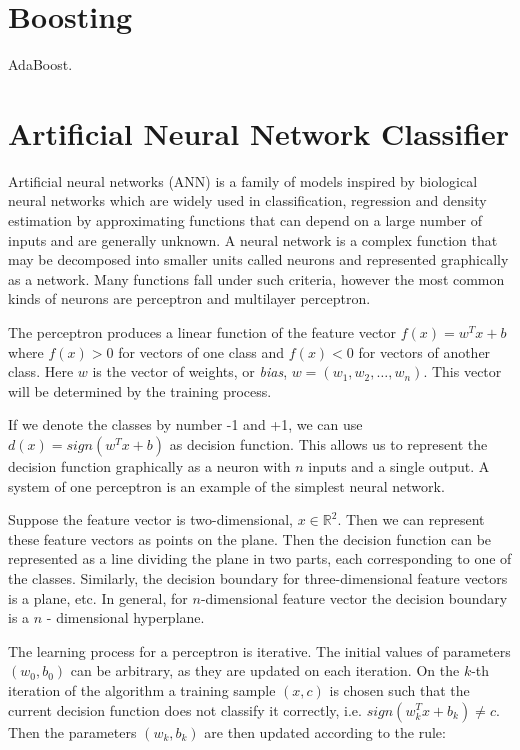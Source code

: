 \documentclass[12pt]{report}
\newcommand{\re}{\mathbb{R}}
\begin{document}
\section{Boosting}

AdaBoost.

\newpage

\section{Artificial Neural Network Classifier}

Artificial neural networks (ANN) is a family of models inspired by biological neural networks which are widely used in classification, regression and density estimation by approximating functions that can depend on a large number of inputs and are generally unknown. A neural network is a complex function that may be decomposed into smaller units called neurons and represented graphically as a network. Many functions fall under such criteria, however the most common kinds of neurons are perceptron and multilayer perceptron.

The perceptron produces a linear function of the feature vector $f(x) = w^Tx + b$ where $f(x) > 0$ for vectors of one class and $f(x) < 0$ for vectors of another class. Here $w$ is the vector of weights, or \textit{bias}, $w = (w_1, w_2, \dots, w_n)$. This vector will be determined by the training process.

If we denote the classes by number -1 and +1, we can use $d(x) = sign(w^Tx + b)$ as decision function. This allows us to represent the decision function graphically as a neuron with $n$ inputs and a single output. A system of one perceptron is an example of the simplest neural network.

Suppose the feature vector is two-dimensional, $x \in \re^2$. Then we can represent these feature vectors as points on the plane. Then the decision function can be represented as a line dividing the plane in two parts, each corresponding to one of the classes. Similarly, the decision boundary for three-dimensional feature vectors is a plane, etc. In general, for $n$-dimensional feature vector the decision boundary is a $n$ - dimensional hyperplane.

The learning process for a perceptron is iterative. The initial values of parameters $(w_0, b_0)$ can be arbitrary, as they are updated on each iteration. On the $k$-th iteration of the algorithm a training sample $(x, c)$ is chosen such that the current decision function does not classify it correctly, i.e. $sign(w_k^Tx + b_k) \ne c$. Then the parameters $(w_k, b_k)$ are then updated according to the rule:
\end{document}
